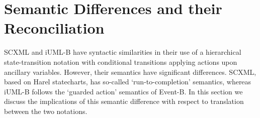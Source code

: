 
\section{Semantic Differences and their Reconciliation}
\label{sect:diff}


SCXML and iUML-B have syntactic similarities in their use of a hierarchical state-transition notation with conditional transitions applying actions upon ancillary variables.
However, their semantics have significant differences. SCXML, based on Harel statecharts, has so-called `run-to-completion' semantics, whereas iUML-B follows the `guarded action' semantics of Event-B.
In this section we discuss the implications of this semantic difference with respect to translation between the two notations.





